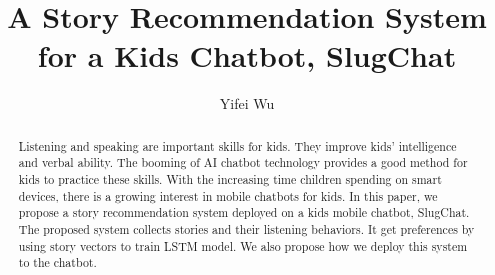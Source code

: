\documentclass[sigconf]{acmart}
\begin{document}
\title{A Story Recommendation System for a Kids Chatbot,  SlugChat}


\author{Yifei Wu}


\renewcommand{\shortauthors}{B. Trovato et al.}


\begin{abstract}
Listening and speaking are important skills for kids. They improve kids' intelligence and verbal ability. The booming of AI chatbot technology provides a good method for kids to practice these skills. With the increasing time children spending on smart devices, there is a growing interest in mobile chatbots for kids. In this paper, we propose a story recommendation system deployed on a kids mobile chatbot, SlugChat. The proposed system collects stories and their listening behaviors. It get preferences by using story vectors to train LSTM model. We also propose how we deploy this system to the chatbot.
\end{abstract}

\maketitle

\end{document}
